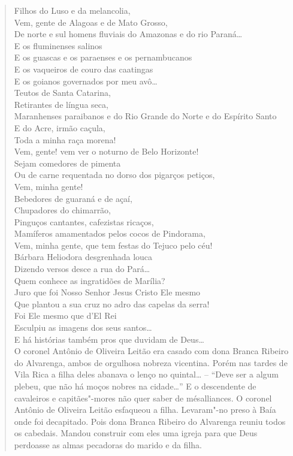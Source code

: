 \begin{verse}
Filhos do Luso e da melancolia,\\
Vem, gente de Alagoas e de Mato Grosso,\\
De norte e sul homens fluviais do Amazonas e do rio Paraná\ldots{}\\
E os fluminenses salinos\\
E os guascas e os paraenses e os pernambucanos\\
E os vaqueiros de couro das caatingas\\
E os goianos governados por meu avô\ldots{}\\
Teutos de Santa Catarina,\\
Retirantes de língua seca,\\
Maranhenses paraibanos e do Rio Grande do Norte e do Espírito Santo\\
E do Acre, irmão caçula,\\
Toda a minha raça morena!\\
Vem, gente! vem ver o noturno de Belo Horizonte!\\
Sejam comedores de pimenta\\
Ou de carne requentada no dorso dos pigarços petiços,\\
Vem, minha gente!\\
Bebedores de guaraná e de açaí,\\
Chupadores do chimarrão,\\
Pinguços cantantes, cafezistas ricaços,\\
Mamíferos amamentados pelos cocos de Pindorama,\\
Vem, minha gente, que tem festas do Tejuco pelo céu!\\
Bárbara Heliodora desgrenhada louca\\
Dizendo versos desce a rua do Pará\ldots{}\\
Quem conhece as ingratidões de Marília?\\
Juro que foi Nosso Senhor Jesus Cristo Ele mesmo\\
Que plantou a sua cruz no adro das capelas da serra!\\
Foi Ele mesmo que d'El Rei\\
Esculpiu as imagens dos seus santos\ldots{}\\
E há histórias também pros que duvidam de Deus\ldots{}\\

O coronel Antônio de Oliveira Leitão era casado com dona Branca Ribeiro
do Alvarenga, ambos de orgulhosa nobreza vicentina. Porém nas tardes de
Vila Rica a filha deles abanava o lenço no quintal\ldots{} -- ``Deve ser a
algum plebeu, que não há moços nobres na cidade\ldots{}'' E o descendente de
cavaleiros e capitães"-mores não quer saber de mésalliances. O coronel
Antônio de Oliveira Leitão esfaqueou a filha. Levaram"-no preso à Baía
onde foi decapitado. Pois dona Branca Ribeiro do Alvarenga reuniu todos
os cabedais. Mandou construir com eles uma igreja para que Deus
perdoasse as almas pecadoras do marido e da filha.


\end{verse}
